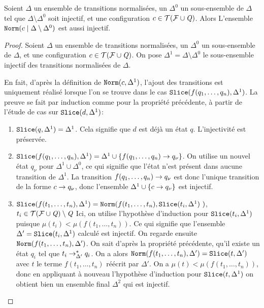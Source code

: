  \begin{property}
   \label{prop:norm_injectivity}
   Soient $\Delta$ un ensemble de transitions normalisées, un $\Delta^0$ un sous-ensemble 
   de $\Delta$ tel que $\Delta \setminus \Delta^0$ soit injectif, et une configuration $c \in \mathcal{ T(F \cup \mathit Q)}$.
   Alors L'ensemble $\mathtt{Norm}(c \; | \; \Delta \setminus \Delta^0)$ est aussi injectif.
 \end{property}

 \begin{proof}
   Soient $\Delta$ un ensemble de transitions normalisées, un $\Delta^0$ un sous-ensemble 
   de $\Delta$, et une configuration $c \in \mathcal{ T(F \cup \mathit Q)}$.
   On pose $\Delta^1 = \Delta \setminus \Delta^0$ le sous-ensemble injectif des transitions normalisées de $\Delta$.
   
   En fait, d'après la définition de $\mathtt{Norm}(c, \Delta^1)$, l'ajout des transitions est 
   uniquement réalisé lorsque l'on se trouve dans le cas $\mathtt{Slice}(f(q_1,\dots,q_n), \Delta^1)$.
   La preuve se fait par induction comme pour la propriété précédente, à partir de l'étude de cas sur $\mathtt{Slice}(d, \Delta^1)$:

   \begin{enumerate}
   \item $\mathtt{Slice}(q, \Delta^1) = \Delta^1$. Cela signifie que $d$ est déjà un état $q$. L'injectivité est préservée.
     
   \item $\mathtt{Slice}(f(q_1, \dots, q_n), \Delta^1) = \Delta^1 \cup \{ f(q_1, \dots, q_n) \rightarrow q_\nu\}$.
     On utilise un nouvel état $q_\nu$ pour $\Delta^1 \cup \Delta^0$, ce qui signifie que l'état n'est présent dans aucune transition
     de $\Delta^1$. La transition $f(q_1, \dots, q_n) \rightarrow q_\nu$ est donc l'unique transition de la forme $c \rightarrow q_\nu$,
     donc l'ensemble $\Delta^1 \cup \{ c \rightarrow q_\nu\}$ est injectif.

   \item $\mathtt{Slice}(f(t_1, \dots, t_n), \Delta^1) = \mathtt{Norm}(f(t_1,\dots, t_n), \mathtt{Slice}(t_i, \Delta^1)\ )$, $t_i \in \mathcal{ T(F \cup \mathit Q)} \setminus \mathit Q$
     Ici, on utilise l'hypothèse d'induction pour $\mathtt{Slice}(t_i, \Delta^1)$ puisque $\mu (t_i) < \mu(f(t_1, \dots, t_n))$.
     Ce qui signifie que l'ensemble $\Delta' = \mathtt{Slice}(t_i, \Delta^1)$ calculé est injectif.
     On regarde ensuite $\mathtt{Norm}(f(t_1,\dots, t_n), \Delta')$. On sait d'après la propriété précédente, qu'il existe
     un état $q_i$ tel que $t_i \rightarrow^*_{\Delta'} q_i$. On a alors $\mathtt{Norm}(f(t_1,\dots, t_n), \Delta') = \mathtt{Slice}(t, \Delta')$
     avec $t$ le terme $f(t_1,\dots, t_n)$ réécrit par $\Delta'$. On a $\mu (t) < \mu(f(t_1, \dots, t_n))$, donc en
     appliquant à nouveau l'hypothèse d'induction pour $\mathtt{Slice}(t, \Delta^1)$ on obtient bien un ensemble final $\Delta^2$ qui est injectif.
   \end{enumerate}

\end{proof}


